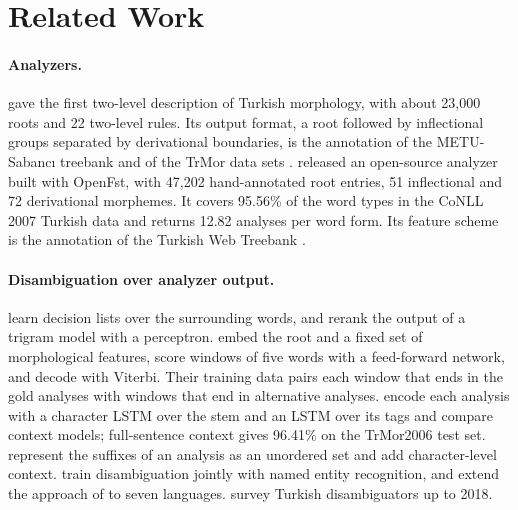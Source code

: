 \section{Related Work}
\label{sec:related}

\paragraph{Analyzers.}
\citet{oflazer-1994-two} gave the first two-level description of Turkish morphology, with about 23,000 roots and 22 two-level rules. Its output format, a root followed by inflectional groups separated by derivational boundaries, is the annotation of the METU-Sabancı treebank \citep{oflazer-etal-2003-building} and of the TrMor data sets \citep{yuret-ture-2006-learning,akyurek-etal-2019-morphological}. \citet{ozturel-etal-2019-syntactically} released an open-source analyzer built with OpenFst, with 47,202 hand-annotated root entries, 51 inflectional and 72 derivational morphemes. It covers 95.56\% of the word types in the CoNLL 2007 Turkish data and returns 12.82 analyses per word form. Its feature scheme is the annotation of the Turkish Web Treebank \citep{kayadelen-etal-2020-gold}.

\paragraph{Disambiguation over analyzer output.}
\citet{yuret-ture-2006-learning} learn decision lists over the surrounding words, and \citet{sak-etal-2007-morphological} rerank the output of a trigram model with a perceptron. \citet{yildiz-etal-2016-morphology} embed the root and a fixed set of morphological features, score windows of five words with a feed-forward network, and decode with Viterbi. Their training data pairs each window that ends in the gold analyses with windows that end in alternative analyses. \citet{shen-etal-2016-role} encode each analysis with a character LSTM over the stem and an LSTM over its tags and compare context models; full-sentence context gives 96.41\% on the TrMor2006 test set. \citet{toleu-etal-2017-character} represent the suffixes of an analysis as an unordered set and add character-level context. \citet{gungor-etal-2018-improving} train disambiguation jointly with named entity recognition, and \citet{toleu-etal-2022-language} extend the approach of \citet{toleu-etal-2017-character} to seven languages. \citet{hakkani-tur-etal-2018-morphological} survey Turkish disambiguators up to 2018.

